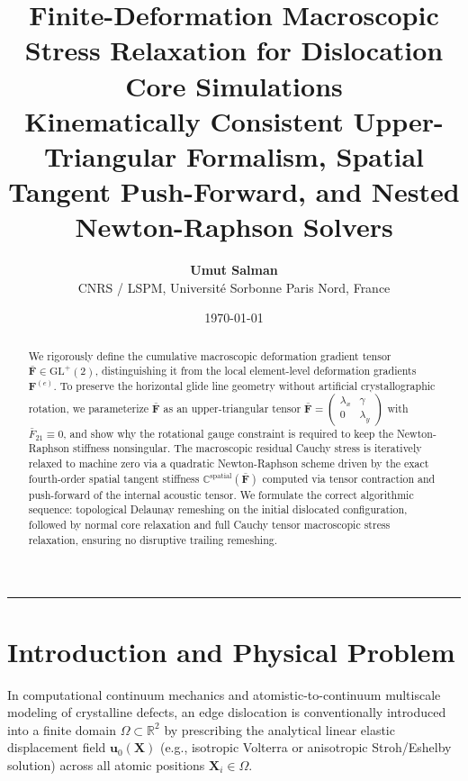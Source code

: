 \documentclass[11pt,a4paper]{article}
\title{\textbf{\LARGE Finite-Deformation Macroscopic Stress Relaxation for Dislocation Core Simulations}\\[0.4em]
\large Kinematically Consistent Upper-Triangular Formalism, Spatial Tangent Push-Forward, and Nested Newton-Raphson Solvers}
\author{\textbf{Umut Salman} \\ CNRS / LSPM, Université Sorbonne Paris Nord, France}
\date{\today}
\begin{document}
\maketitle

\begin{abstract}
We rigorously define the cumulative macroscopic deformation gradient tensor $\bar{\mathbf{F}} \in \mathrm{GL}^+(2)$, distinguishing it from the local element-level deformation gradients $\mathbf{F}^{(e)}$. To preserve the horizontal glide line geometry without artificial crystallographic rotation, we parameterize $\bar{\mathbf{F}}$ as an upper-triangular tensor $\bar{\mathbf{F}} = \begin{pmatrix}\lambda_x & \gamma \\ 0 & \lambda_y\end{pmatrix}$ with $\bar{F}_{21} \equiv 0$, and show why the rotational gauge constraint is required to keep the Newton-Raphson stiffness nonsingular. The macroscopic residual Cauchy stress is iteratively relaxed to machine zero via a quadratic Newton-Raphson scheme driven by the exact fourth-order spatial tangent stiffness $\mathbb{C}^{\text{spatial}}(\bar{\mathbf{F}})$ computed via tensor contraction and push-forward of the internal acoustic tensor. We formulate the correct algorithmic sequence: topological Delaunay remeshing on the initial dislocated configuration, followed by normal core relaxation and full Cauchy tensor macroscopic stress relaxation, ensuring no disruptive trailing remeshing.
\end{abstract}

\vspace{0.5em}
\tableofcontents
\vspace{1em}
\hrule
\vspace{1.5em}

\section{Introduction and Physical Problem}

In computational continuum mechanics and atomistic-to-continuum multiscale modeling of crystalline defects, an edge dislocation is conventionally introduced into a finite domain $\Omega \subset \mathbb{R}^2$ by prescribing the analytical linear elastic displacement field $\mathbf{u}_0(\mathbf{X})$ (e.g., isotropic Volterra or anisotropic Stroh/Eshelby solution) across all atomic positions $\mathbf{X}_i \in \Omega$.
\end{document}
